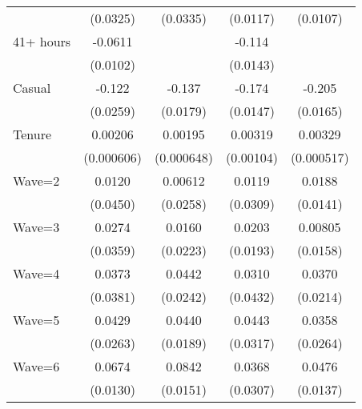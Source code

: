 {\begin{tabular}{l*{4}{c}}
                    &    (0.0325)         &    (0.0335)         &    (0.0117)         &    (0.0107)         \\
[1em]
41+ hours           &     -0.0611\sym{***}&                     &      -0.114\sym{***}&                     \\
                    &    (0.0102)         &                     &    (0.0143)         &                     \\
[1em]
Casual              &      -0.122\sym{***}&      -0.137\sym{***}&      -0.174\sym{***}&      -0.205\sym{***}\\
                    &    (0.0259)         &    (0.0179)         &    (0.0147)         &    (0.0165)         \\
[1em]
Tenure              &     0.00206\sym{***}&     0.00195\sym{**} &     0.00319\sym{**} &     0.00329\sym{***}\\
                    &  (0.000606)         &  (0.000648)         &   (0.00104)         &  (0.000517)         \\
[1em]
Wave=2              &      0.0120         &     0.00612         &      0.0119         &      0.0188         \\
                    &    (0.0450)         &    (0.0258)         &    (0.0309)         &    (0.0141)         \\
[1em]
Wave=3              &      0.0274         &      0.0160         &      0.0203         &     0.00805         \\
                    &    (0.0359)         &    (0.0223)         &    (0.0193)         &    (0.0158)         \\
[1em]
Wave=4              &      0.0373         &      0.0442         &      0.0310         &      0.0370         \\
                    &    (0.0381)         &    (0.0242)         &    (0.0432)         &    (0.0214)         \\
[1em]
Wave=5              &      0.0429         &      0.0440\sym{*}  &      0.0443         &      0.0358         \\
                    &    (0.0263)         &    (0.0189)         &    (0.0317)         &    (0.0264)         \\
[1em]
Wave=6              &      0.0674\sym{***}&      0.0842\sym{***}&      0.0368         &      0.0476\sym{***}\\
                    &    (0.0130)         &    (0.0151)         &    (0.0307)         &    (0.0137)         \\

\end{tabular}}
